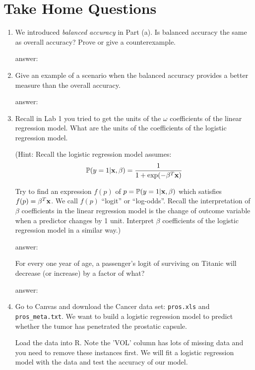 \documentclass{article}
\newcommand{\answerbox}[1]{
	\begin{center}
		\ifdefined\printsol
			\begin{mdframed}
				\begin{minipage}{0.95\textwidth}
					{\color{blue} {#1}}
				\end{minipage}
			\end{mdframed}
		\else
			\begin{mdframed}
				\begin{minipage}{0.95\textwidth}
					\phantom{\parbox{\linewidth}{#1}}
				\end{minipage}
			\end{mdframed}
		\fi
		\end{center}
	}
\begin{document}
\section*{Take Home Questions}
\begin{enumerate}
\def\labelenumi{(\arabic{enumi})}
\itemsep1pt\parskip0pt

\item We introduced \textit{balanced accuracy} in Part (a). Is balanced accuracy the same as overall accuracy? Prove or give a counterexample.
\vspace{-0.2cm}
\answerbox{
answer:
}

\item Give an example of a scenario when the balanced accuracy provides a better measure than the overall
accuracy.
\answerbox{
answer:
}

\item
  Recall in Lab 1 you tried to get the units of the $\omega$
  coefficients of the linear regression model. What are the units of the
  coefficients of the logistic regression model.


(Hint: Recall the logistic regression model assumes:
\[
	\mathbb{P}(y=1 | {\bf x}, {\bf \beta}) = \frac{1}{1+\exp(-{\bf \beta}^T{\bf
	x})}
\]

Try to find an expression $f(p)$ of $p=\mathbb{P}(y=1 | {\bf x}, {\bf \beta})$
which satisfies $f(p) = {\bf \beta}^T{\bf x}$. We call $f(p)$ ``logit''
or ``log-odds''. Recall the interpretation of $\beta$ coefficients in
the linear regression model is the change of outcome variable when a
predictor changes by 1 unit. Interpret $\beta$ coefficients of the
logistic regression model in a similar way.)

\answerbox{
answer:
}

\bigskip

For every one year of age, a passenger's logit of surviving on Titanic will decrease (or increase) by a factor of what?

\answerbox{
answer:
}

\item
  Go to Canvas and download the Cancer data set: \texttt{pros.xls} and
  \texttt{pros\_meta.txt}. We want to build a logistic regression model to
  predict whether the tumor has penetrated the prostatic capsule.

  \bigskip

Load the data into R. Note the 'VOL' column has lots of missing data
and you need to remove these instances first. We will fit a logistic
regression model with the data and test the accuracy of our model.


\end{enumerate}
\end{document}

